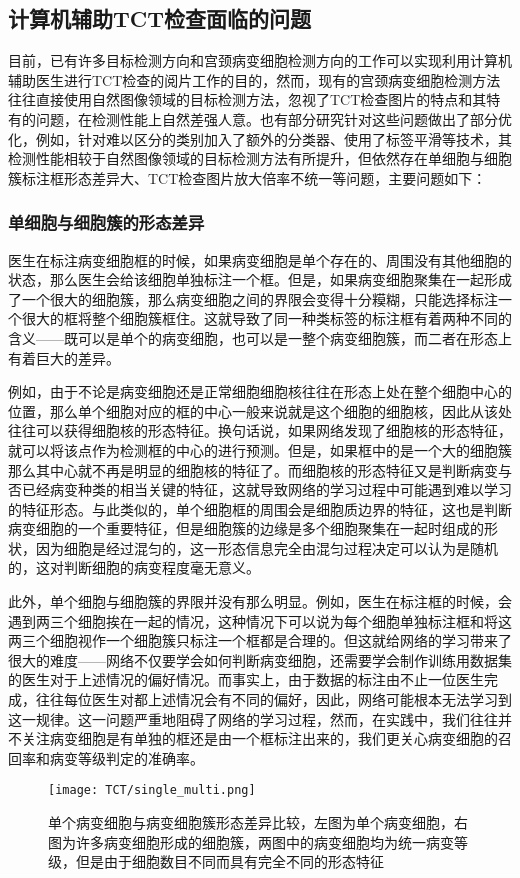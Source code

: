 \subsection{计算机辅助TCT检查面临的问题}
\label{sec:计算机辅助检查面临的问题}
\par 目前，已有许多目标检测方向和宫颈病变细胞检测方向的工作可以实现利用计算机辅助医生进行TCT检查的阅片工作的目的，然而，现有的宫颈病变细胞检测方法往往直接使用自然图像领域的目标检测方法，忽视了TCT检查图片的特点和其特有的问题，在检测性能上自然差强人意。也有部分研究针对这些问题做出了部分优化，例如，针对难以区分的类别加入了额外的分类器、使用了标签平滑等技术，其检测性能相较于自然图像领域的目标检测方法有所提升，但依然存在单细胞与细胞簇标注框形态差异大、TCT检查图片放大倍率不统一等问题，主要问题如下：

\subsubsection{单细胞与细胞簇的形态差异}
\label{par:单细胞与细胞簇的形态差异}
\par 医生在标注病变细胞框的时候，如果病变细胞是单个存在的、周围没有其他细胞的状态，那么医生会给该细胞单独标注一个框。但是，如果病变细胞聚集在一起形成了一个很大的细胞簇，那么病变细胞之间的界限会变得十分糢糊，只能选择标注一个很大的框将整个细胞簇框住。这就导致了同一种类标签的标注框有着两种不同的含义——既可以是单个的病变细胞，也可以是一整个病变细胞簇，而二者在形态上有着巨大的差异。
\par 例如，由于不论是病变细胞还是正常细胞细胞核往往在形态上处在整个细胞中心的位置，那么单个细胞对应的框的中心一般来说就是这个细胞的细胞核，因此从该处往往可以获得细胞核的形态特征。换句话说，如果网络发现了细胞核的形态特征，就可以将该点作为检测框的中心的进行预测。但是，如果框中的是一个大的细胞簇那么其中心就不再是明显的细胞核的特征了。而细胞核的形态特征又是判断病变与否已经病变种类的相当关键的特征，这就导致网络的学习过程中可能遇到难以学习的特征形态。与此类似的，单个细胞框的周围会是细胞质边界的特征，这也是判断病变细胞的一个重要特征，但是细胞簇的边缘是多个细胞聚集在一起时组成的形状，因为细胞是经过混匀的，这一形态信息完全由混匀过程决定可以认为是随机的，这对判断细胞的病变程度毫无意义。
\par 此外，单个细胞与细胞簇的界限并没有那么明显。例如，医生在标注框的时候，会遇到两三个细胞挨在一起的情况，这种情况下可以说为每个细胞单独标注框和将这两三个细胞视作一个细胞簇只标注一个框都是合理的。但这就给网络的学习带来了很大的难度——网络不仅要学会如何判断病变细胞，还需要学会制作训练用数据集的医生对于上述情况的偏好情况。而事实上，由于数据的标注由不止一位医生完成，往往每位医生对都上述情况会有不同的偏好，因此，网络可能根本无法学习到这一规律。这一问题严重地阻碍了网络的学习过程，然而，在实践中，我们往往并不关注病变细胞是有单独的框还是由一个框标注出来的，我们更关心病变细胞的召回率和病变等级判定的准确率。
\begin{figure}[h]
    \centering
    \texttt{[image: TCT/single\_multi.png]}
    \caption{单个病变细胞与病变细胞簇形态差异比较，左图为单个病变细胞，右图为许多病变细胞形成的细胞簇，两图中的病变细胞均为统一病变等级，但是由于细胞数目不同而具有完全不同的形态特征}
    \label{论文形态差异}
\end{figure}
